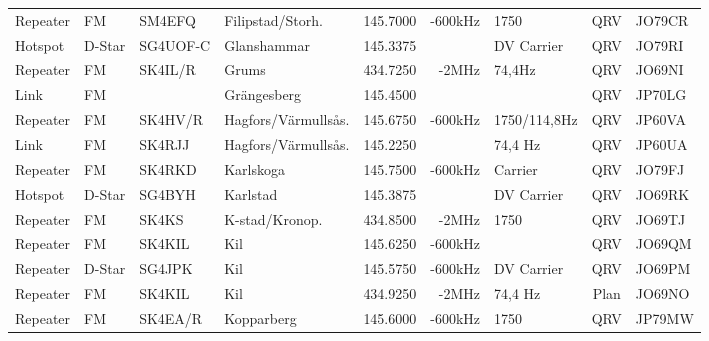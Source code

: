 \begin{landscape}
\begin{longtable}{llllrrlcl}
	Repeater          & FM           & SM4EFQ        & Filipstad/Storh.    &          145.7000 &        -600kHz & 1750            &       QRV       & JO79CR           \\
	Hotspot           & D-Star       & SG4UOF-C      & Glanshammar         &          145.3375 &                & DV Carrier      &       QRV       & JO79RI           \\
	Repeater          & FM           & SK4IL/R       & Grums               &          434.7250 &          -2MHz & 74,4Hz          &       QRV       & JO69NI           \\
	Link              & FM           &               & Grängesberg         &          145.4500 &                &                 &       QRV       & JP70LG           \\
	Repeater          & FM           & SK4HV/R       & Hagfors/Värmullsås. &          145.6750 &        -600kHz & 1750/114,8Hz    &       QRV       & JP60VA           \\
	Link              & FM           & SK4RJJ        & Hagfors/Värmullsås. &          145.2250 &                & 74,4 Hz         &       QRV       & JP60UA           \\
	Repeater          & FM           & SK4RKD        & Karlskoga           &          145.7500 &        -600kHz & Carrier         &       QRV       & JO79FJ           \\
	Hotspot           & D-Star       & SG4BYH        & Karlstad            &          145.3875 &                & DV Carrier      &       QRV       & JO69RK           \\
	Repeater          & FM           & SK4KS         & K-stad/Kronop.      &          434.8500 &          -2MHz & 1750            &       QRV       & JO69TJ           \\
	Repeater          & FM           & SK4KIL        & Kil                 &          145.6250 &        -600kHz &                 &       QRV       & JO69QM           \\
	Repeater          & D-Star       & SG4JPK        & Kil                 &          145.5750 &        -600kHz & DV Carrier      &       QRV       & JO69PM           \\
	Repeater          & FM           & SK4KIL        & Kil                 &          434.9250 &          -2MHz & 74,4 Hz         &      Plan       & JO69NO           \\
	Repeater          & FM           & SK4EA/R       & Kopparberg          &          145.6000 &        -600kHz & 1750            &       QRV       & JP79MW           \\

\end{longtable}
\end{landscape}
